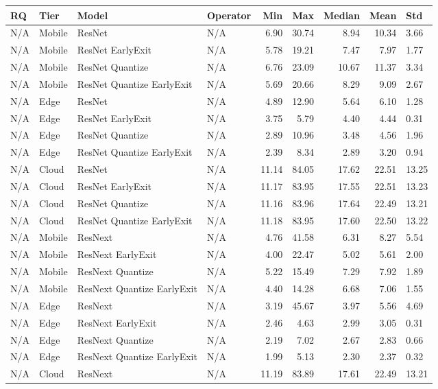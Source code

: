 \begin{tabular}{|l|l|l|l|r|r|r|r|}
\hline
RQ & Tier & Model & Operator & Min & Max & Median & Mean & Std \\
\hline
N/A & Mobile & ResNet & N/A & 6.90 & 30.74 & 8.94 & 10.34 & 3.66 \\
N/A & Mobile & ResNet EarlyExit & N/A & 5.78 & 19.21 & 7.47 & 7.97 & 1.77 \\
N/A & Mobile & ResNet Quantize & N/A & 6.76 & 23.09 & 10.67 & 11.37 & 3.34 \\
N/A & Mobile & ResNet Quantize EarlyExit & N/A & 5.69 & 20.66 & 8.29 & 9.09 & 2.67 \\
N/A & Edge & ResNet & N/A & 4.89 & 12.90 & 5.64 & 6.10 & 1.28 \\
N/A & Edge & ResNet EarlyExit & N/A & 3.75 & 5.79 & 4.40 & 4.44 & 0.31 \\
N/A & Edge & ResNet Quantize & N/A & 2.89 & 10.96 & 3.48 & 4.56 & 1.96 \\
N/A & Edge & ResNet Quantize EarlyExit & N/A & 2.39 & 8.34 & 2.89 & 3.20 & 0.94 \\
N/A & Cloud & ResNet & N/A & 11.14 & 84.05 & 17.62 & 22.51 & 13.25 \\
N/A & Cloud & ResNet EarlyExit & N/A & 11.17 & 83.95 & 17.55 & 22.51 & 13.23 \\
N/A & Cloud & ResNet Quantize & N/A & 11.16 & 83.96 & 17.64 & 22.49 & 13.21 \\
N/A & Cloud & ResNet Quantize EarlyExit & N/A & 11.18 & 83.95 & 17.60 & 22.50 & 13.22 \\
N/A & Mobile & ResNext & N/A & 4.76 & 41.58 & 6.31 & 8.27 & 5.54 \\
N/A & Mobile & ResNext EarlyExit & N/A & 4.00 & 22.47 & 5.02 & 5.61 & 2.00 \\
N/A & Mobile & ResNext Quantize & N/A & 5.22 & 15.49 & 7.29 & 7.92 & 1.89 \\
N/A & Mobile & ResNext Quantize EarlyExit & N/A & 4.40 & 14.28 & 6.68 & 7.06 & 1.55 \\
N/A & Edge & ResNext & N/A & 3.19 & 45.67 & 3.97 & 5.56 & 4.69 \\
N/A & Edge & ResNext EarlyExit & N/A & 2.46 & 4.63 & 2.99 & 3.05 & 0.31 \\
N/A & Edge & ResNext Quantize & N/A & 2.19 & 7.02 & 2.67 & 2.83 & 0.66 \\
N/A & Edge & ResNext Quantize EarlyExit & N/A & 1.99 & 5.13 & 2.30 & 2.37 & 0.32 \\
N/A & Cloud & ResNext & N/A & 11.19 & 83.89 & 17.61 & 22.49 & 13.21 \\

\end{tabular}
